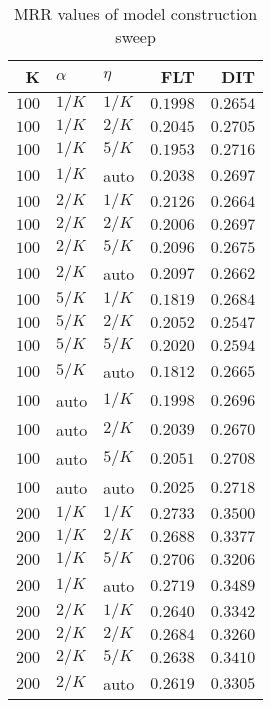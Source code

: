 
\begin{table}
\begin{spacing}{1.2}
\centering
\caption{MRR values of \openjpa model construction sweep}
\label{table:openjpa_model_sweep}
\vspace{0.2em}
\parbox{.45\linewidth}{\centering \begin{tabular}{rll|rr}
\toprule
    K &  $\alpha$ &    $\eta$ &      FLT &      DIT \\
\midrule
$100$ &  $1/K$ &  $1/K$ & $0.1998$ & $0.2654$ \\
$100$ &  $1/K$ &  $2/K$ & $0.2045$ & $0.2705$ \\
$100$ &  $1/K$ &  $5/K$ & $0.1953$ & $0.2716$ \\
$100$ &  $1/K$ &   auto & $0.2038$ & $0.2697$ \\
$100$ &  $2/K$ &  $1/K$ & $0.2126$ & $0.2664$ \\
$100$ &  $2/K$ &  $2/K$ & $0.2006$ & $0.2697$ \\
$100$ &  $2/K$ &  $5/K$ & $0.2096$ & $0.2675$ \\
$100$ &  $2/K$ &   auto & $0.2097$ & $0.2662$ \\
$100$ &  $5/K$ &  $1/K$ & $0.1819$ & $0.2684$ \\
$100$ &  $5/K$ &  $2/K$ & $0.2052$ & $0.2547$ \\
$100$ &  $5/K$ &  $5/K$ & $0.2020$ & $0.2594$ \\
$100$ &  $5/K$ &   auto & $0.1812$ & $0.2665$ \\
$100$ &   auto &  $1/K$ & $0.1998$ & $0.2696$ \\
$100$ &   auto &  $2/K$ & $0.2039$ & $0.2670$ \\
$100$ &   auto &  $5/K$ & $0.2051$ & $0.2708$ \\
$100$ &   auto &   auto & $0.2025$ & $0.2718$ \\
$200$ &  $1/K$ &  $1/K$ & $0.2733$ & $0.3500$ \\
$200$ &  $1/K$ &  $2/K$ & $0.2688$ & $0.3377$ \\
$200$ &  $1/K$ &  $5/K$ & $0.2706$ & $0.3206$ \\
$200$ &  $1/K$ &   auto & $0.2719$ & $0.3489$ \\
$200$ &  $2/K$ &  $1/K$ & $0.2640$ & $0.3342$ \\
$200$ &  $2/K$ &  $2/K$ & $0.2684$ & $0.3260$ \\
$200$ &  $2/K$ &  $5/K$ & $0.2638$ & $0.3410$ \\
$200$ &  $2/K$ &   auto & $0.2619$ & $0.3305$ \\

\end{tabular}}
\end{spacing}
\end{table}
